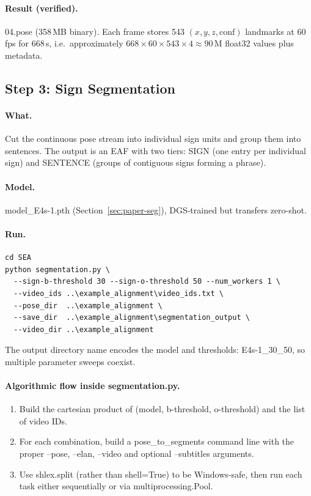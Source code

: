 \documentclass[11pt,a4paper]{article}
\def\texttt#1{#1}%
\def\textbf#1{#1}%
\begin{document}
\paragraph{Result (verified).} \texttt{04.pose} (\textbf{358\,MB} binary).
Each frame stores 543 $(x,y,z,\text{conf})$ landmarks at 60\,fps for 668\,s,
i.e.\ approximately $668 \times 60 \times 543 \times 4 \approx 90$\,M float32
values plus metadata.


\subsection{Step 3: Sign Segmentation}
\label{sec:step3}

\paragraph{What.} Cut the continuous pose stream into individual sign units
and group them into sentences. The output is an EAF with two tiers:
\texttt{SIGN} (one entry per individual sign) and \texttt{SENTENCE} (groups
of contiguous signs forming a phrase).

\paragraph{Model.} \texttt{model\_E4s-1.pth} (Section~\ref{sec:paper-seg}),
DGS-trained but transfers zero-shot.

\paragraph{Run.}
\begin{lstlisting}
cd SEA
python segmentation.py \
  --sign-b-threshold 30 --sign-o-threshold 50 --num_workers 1 \
  --video_ids ..\example_alignment\video_ids.txt \
  --pose_dir  ..\example_alignment \
  --save_dir  ..\example_alignment\segmentation_output \
  --video_dir ..\example_alignment
\end{lstlisting}
The output directory name encodes the model and thresholds:
\texttt{E4s-1\_30\_50}, so multiple parameter sweeps coexist.

\paragraph{Algorithmic flow inside \texttt{segmentation.py}.}
\begin{enumerate}[leftmargin=1.5em]
  \item Build the cartesian product of (\texttt{model}, \texttt{b-threshold},
        \texttt{o-threshold}) and the list of video IDs.
  \item For each combination, build a \texttt{pose\_to\_segments} command
        line with the proper \texttt{--pose}, \texttt{--elan}, \texttt{--video}
        and optional \texttt{--subtitles} arguments.
  \item Use \texttt{shlex.split} (rather than \texttt{shell=True}) to be
        Windows-safe, then run each task either sequentially or via
        \texttt{multiprocessing.Pool}.
\end{enumerate}
\end{document}

